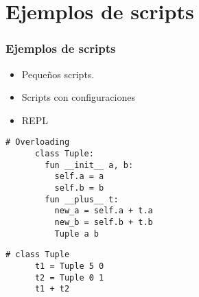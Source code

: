 \section{Ejemplos de scripts}
\begin{frame}
  \frametitle{Ejemplos de scripts}
  \begin{center}
    \begin{itemize}
      \item Pequeños scripts.
      \item Scripts con configuraciones
      \item REPL
    \end{itemize}
  \end{center}
  \framebreak{}
  \begin{center}
    \begin{lstlisting}[language=scriptflow]
      # Overloading
      class Tuple:
        fun __init__ a, b:
          self.a = a
          self.b = b
        fun __plus__ t:
          new_a = self.a + t.a
          new_b = self.b + t.b
          Tuple a b
    \end{lstlisting}
  \end{center}
  \framebreak{}
  \begin{center}
    \begin{lstlisting}[language=scriptflow]
      # class Tuple
      t1 = Tuple 5 0
      t2 = Tuple 0 1
      t1 + t2
    \end{lstlisting}
  \end{center}

\end{frame}

